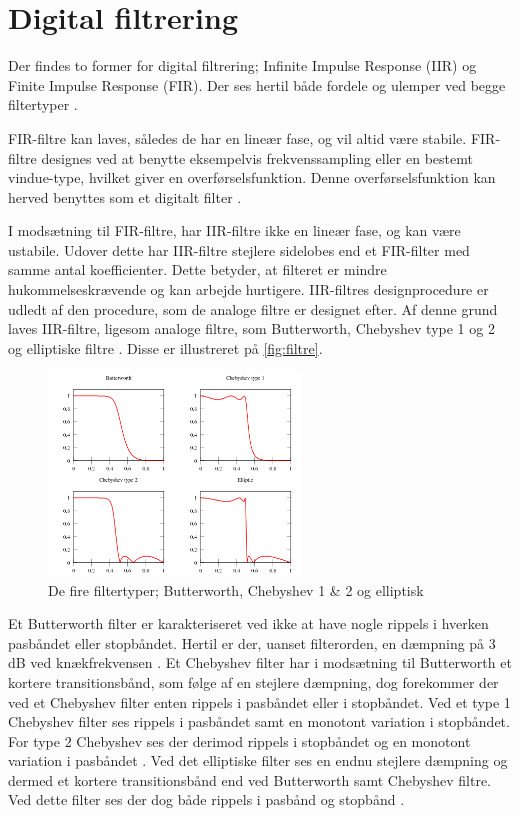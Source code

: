 \section{Digital filtrering}
Der findes to former for digital filtrering; Infinite Impulse Response (IIR) og Finite Impulse Response (FIR). Der ses hertil både fordele og ulemper ved begge filtertyper \citep{blandford2012}.

FIR-filtre kan laves, således de har en lineær fase, og vil altid være stabile. FIR-filtre designes ved at benytte eksempelvis frekvenssampling eller en bestemt vindue-type, hvilket giver en overførselsfunktion. Denne overførselsfunktion kan herved benyttes som et digitalt filter \citep{blandford2012}. 

I modsætning til FIR-filtre, har IIR-filtre ikke en lineær fase, og kan være ustabile. Udover dette har IIR-filtre stejlere sidelobes end et FIR-filter med samme antal koefficienter. Dette betyder, at filteret er mindre hukommelseskrævende og kan arbejde hurtigere. IIR-filtres designprocedure er udledt af den procedure, som de analoge filtre er designet efter. Af denne grund laves IIR-filtre, ligesom analoge filtre, som Butterworth, Chebyshev type 1 og 2 og elliptiske filtre \citep{blandford2012}. Disse er illustreret på \autoref{fig:filtre}. 
\\

\begin{figure}[H]
\centering
\includegraphics[width=0.6\textwidth]{figures/filtre}
\caption{De fire filtertyper; Butterworth, Chebyshev 1 \& 2 og elliptisk \citep{wikipedia2016}}
\label{fig:filtre}
\end{figure}

\noindent
Et Butterworth filter er karakteriseret ved ikke at have nogle rippels i hverken pasbåndet eller stopbåndet. Hertil er der, uanset filterorden, en dæmpning på 3 dB ved knækfrekvensen \citep{nilsson2015}.
Et Chebyshev filter har i modsætning til Butterworth et kortere transitionsbånd, som følge af en stejlere dæmpning, dog forekommer der ved et Chebyshev filter enten rippels i pasbåndet eller i stopbåndet. Ved et type 1 Chebyshev filter ses rippels i pasbåndet samt en monotont variation i stopbåndet. For type 2 Chebyshev ses der derimod rippels i stopbåndet og en monotont variation i pasbåndet \citep{nilsson2015}. 
Ved det elliptiske filter ses en endnu stejlere dæmpning og dermed et kortere transitionsbånd end ved Butterworth samt Chebyshev filtre. Ved dette filter ses der dog både rippels i pasbånd og stopbånd \citep{nilsson2015}. 

